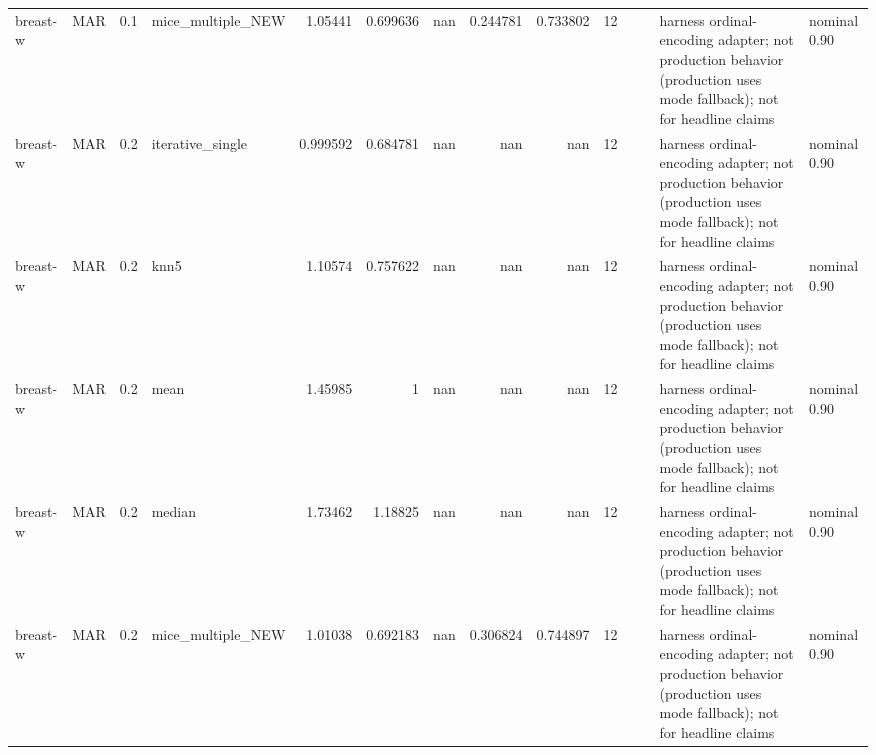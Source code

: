 \begin{table}[ht]
\begin{tabular}{llrlrrrrrrllll}
 breast-w             & MAR         &         0.1 & mice\_multiple\_NEW &       1.05441  &             0.699636 &               nan        &                       0.244781 &                         0.733802 &        12 &                    &                                         & harness ordinal-encoding adapter; not production behavior (production uses mode fallback); not for headline claims & nominal 0.90              \\
 breast-w             & MAR         &         0.2 & iterative\_single  &       0.999592 &             0.684781 &               nan        &                     nan        &                       nan        &        12 &                    &                                         & harness ordinal-encoding adapter; not production behavior (production uses mode fallback); not for headline claims & nominal 0.90              \\
 breast-w             & MAR         &         0.2 & knn5              &       1.10574  &             0.757622 &               nan        &                     nan        &                       nan        &        12 &                    &                                         & harness ordinal-encoding adapter; not production behavior (production uses mode fallback); not for headline claims & nominal 0.90              \\
 breast-w             & MAR         &         0.2 & mean              &       1.45985  &             1        &               nan        &                     nan        &                       nan        &        12 &                    &                                         & harness ordinal-encoding adapter; not production behavior (production uses mode fallback); not for headline claims & nominal 0.90              \\
 breast-w             & MAR         &         0.2 & median            &       1.73462  &             1.18825  &               nan        &                     nan        &                       nan        &        12 &                    &                                         & harness ordinal-encoding adapter; not production behavior (production uses mode fallback); not for headline claims & nominal 0.90              \\
 breast-w             & MAR         &         0.2 & mice\_multiple\_NEW &       1.01038  &             0.692183 &               nan        &                       0.306824 &                         0.744897 &        12 &                    &                                         & harness ordinal-encoding adapter; not production behavior (production uses mode fallback); not for headline claims & nominal 0.90              \\

\end{tabular}
\end{table}
